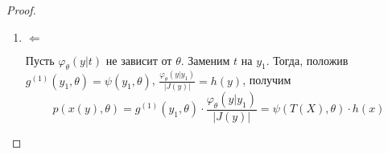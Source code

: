 \documentclass[12pt, russian]{article}
\begin{document}
\begin{proof}
\begin{enumerate}
\begin{enumerate}
$$ \varphi_\theta(y|t) = \left.\frac{\psi(t, \theta)\cdot h(x(y)) \cdot |J(y)|}{\idotsint\limits_{\mathbb{R}^{n-1}}{\psi(t, \theta)\cdot h(x(y))\cdot |J(y)|\,dy_2\ldots dy_n}}\right|_{y_1 = t} \text{ не зависит от } \theta$$

\item $\Leftarrow$

Пусть $\varphi_\theta(y|t)$ не зависит от $\theta$. Заменим $t$ на $y_1$. Тогда, положив $g^{(1)}(y_1, \theta) = \psi(y_1, \theta)$, $\frac{\varphi_\theta(y|y_1)}{|J(y)|} = h(y)$, получим
$$ p(x(y), \theta) = g^{(1)}(y_1, \theta) \cdot \frac{\varphi_\theta(y|y_1)}{|J(y)|} = \psi(T(X), \theta)\cdot h(x)$$ 
\end{enumerate}
\end{enumerate}
\end{proof}
\end{document}
